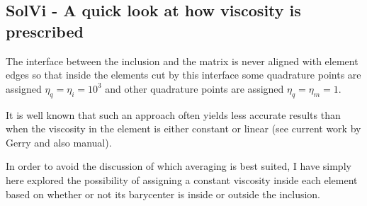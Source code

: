 \newpage
\subsection*{SolVi - A quick look at how viscosity is prescribed}

The interface between the inclusion and the matrix is never aligned with 
element edges so that inside the elements cut by this interface some 
quadrature points are assigned $\eta_q=\eta_{i}=10^3$ and other 
quadrature points are assigned $\eta_q=\eta_{m}=1$. 

It is well known that such an approach often yields less accurate results
than when the viscosity in the element is either constant or linear (see 
current work by Gerry and also \aspect manual).

In order to avoid the discussion of which averaging is best suited, 
I have simply here explored the possibility of assigning a constant 
viscosity inside each element based on whether or not its barycenter is 
inside or outside the inclusion.

